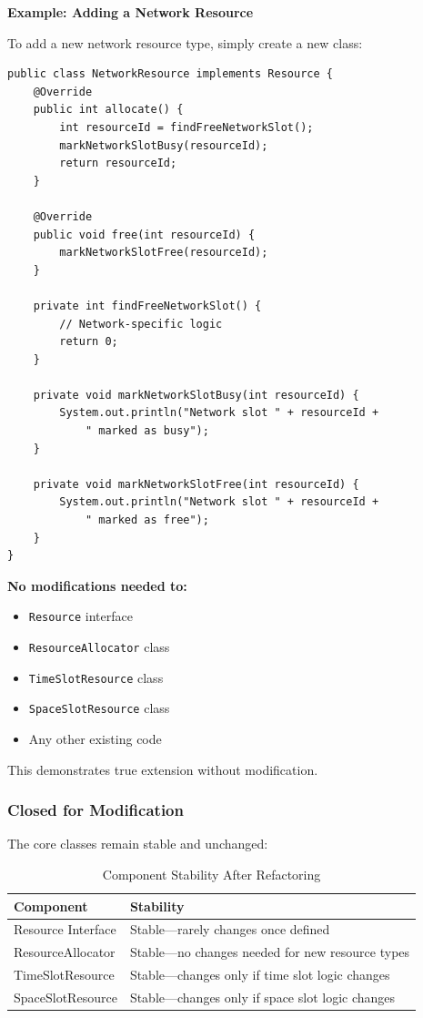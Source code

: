 \textbf{Example: Adding a Network Resource}

To add a new network resource type, simply create a new class:

\begin{verbatim}
public class NetworkResource implements Resource {
    @Override
    public int allocate() {
        int resourceId = findFreeNetworkSlot();
        markNetworkSlotBusy(resourceId);
        return resourceId;
    }
    
    @Override
    public void free(int resourceId) {
        markNetworkSlotFree(resourceId);
    }
    
    private int findFreeNetworkSlot() {
        // Network-specific logic
        return 0;
    }
    
    private void markNetworkSlotBusy(int resourceId) {
        System.out.println("Network slot " + resourceId + 
            " marked as busy");
    }
    
    private void markNetworkSlotFree(int resourceId) {
        System.out.println("Network slot " + resourceId + 
            " marked as free");
    }
}
\end{verbatim}

\textbf{No modifications needed to:}
\begin{itemize}
    \item \texttt{Resource} interface
    \item \texttt{ResourceAllocator} class
    \item \texttt{TimeSlotResource} class
    \item \texttt{SpaceSlotResource} class
    \item Any other existing code
\end{itemize}

This demonstrates true extension without modification.

\subsubsection{Closed for Modification}

The core classes remain stable and unchanged:

\begin{table}[H]
\centering
\begin{tabular}{|l|p{9cm}|}
\hline
\textbf{Component} & \textbf{Stability} \\
\hline
Resource Interface & Stable—rarely changes once defined \\
\hline
ResourceAllocator & Stable—no changes needed for new resource types \\
\hline
TimeSlotResource & Stable—changes only if time slot logic changes \\
\hline
SpaceSlotResource & Stable—changes only if space slot logic changes \\
\hline
\end{tabular}
\caption{Component Stability After Refactoring}
\label{tab:ocp_stability}
\end{table}

